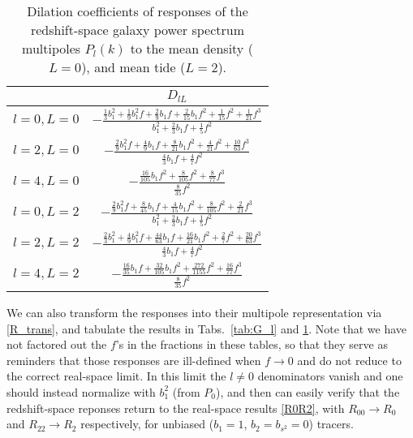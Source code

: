 \documentclass[a4paper,11pt]{article}
\begin{document}
\begin{table}[tbp]
    \centering
    \caption{Dilation coefficients of responses of the redshift-space galaxy
    power spectrum multipoles $P_l(k)$ to the mean density ($L=0$), and mean
    tide ($L=2$).}
    \label{tab:D_l}
    \begin{tabular}{c|c}
        \hline
        & $D_{lL}$ \\
        \hline
        $l=0,L=0$
        & $\displaystyle-\frac{\frac13b_1^2 + \frac19b_1^2f + \frac29b_1f
            + \frac2{15}b_1f^2 + \frac1{15}f^2 + \frac1{21}f^3}
        {b_1^2 + \frac23b_1f + \frac15f^2}$ \\[1em]
        $l=2,L=0$
        & $\displaystyle-\frac{\frac29b_1^2f + \frac49b_1f + \frac8{21}b_1f^2
            + \frac4{21}f^2 + \frac{10}{63}f^3}
        {\frac43b_1f + \frac47f^2}$ \\[1em]
        $l=4,L=0$
        & $\displaystyle-\frac{\frac{16}{105}b_1f^2 + \frac8{105}f^2 + \frac8{77}f^3}
        {\frac8{35}f^2}$ \\[1em]
        $l=0,L=2$
        & $\displaystyle-\frac{\frac29b_1^2f + \frac8{45}b_1f + \frac4{15}b_1f^2
            + \frac8{105}f^2 + \frac2{21}f^3}
        {b_1^2 + \frac23b_1f + \frac15f^2}$ \\[1em]
        $l=2,L=2$
        & $\displaystyle-\frac{\frac23b_1^2 + \frac49b_1^2f + \frac{44}{63}b_1f
            + \frac{16}{21}b_1f^2 + \frac27f^2 + \frac{20}{63}f^3}
        {\frac43b_1f + \frac47f^2}$ \\[1em]
        $l=4,L=2$
        & $\displaystyle-\frac{\frac{16}{35}b_1f + \frac{32}{105}b_1f^2 + \frac{272}{1155}f^2
            + \frac{16}{77}f^3}
        {\frac8{35}f^2}$ \\
        \hline
    \end{tabular}
\end{table}

We can also transform the responses into their multipole representation via
\eqref{R_trans}, and tabulate the results in Tabs.~\ref{tab:G_l} and
\ref{tab:D_l}.
Note that we have not factored out the $f$'s in the fractions in these tables, so that they
serve as reminders that those responses are ill-defined when $f\to0$ and do not
reduce to the correct real-space limit.
In this limit the $l\neq0$ denominators vanish and one should instead normalize
with $b_1^2$ (from $P_0$), and then can easily verify that the redshift-space
reponses return to the real-space results \eqref{R0R2}, with $R_{00}\to R_0$
and $R_{22}\to R_2$ respectively, for unbiased ($b_1=1$, $b_2=b_{s^2}=0$)
tracers.
\end{document}
